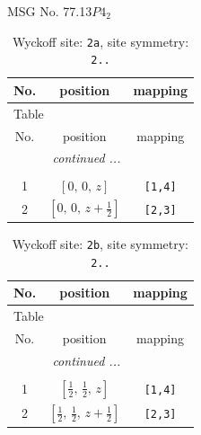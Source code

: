 \documentclass[fleqn,8pt]{jsarticle}
\begin{document}
\setcounter{MaxMatrixCols}{32}

\renewcommand{\tablename}{Table~}
\renewcommand{\figurename}{Figure~}
\begin{center}
\LARGE
MSG No. 77.13\quad$P4_{2}$
\end{center}
\renewcommand{\arraystretch}{1.2}
\begin{longtable}{ccc}
\caption{Wyckoff site: {\tt 2a}, site symmetry: {\tt 2..}}
 \\
 \hline \hline
No. & position & mapping \\ \hline \endfirsthead

\multicolumn{2}{l}{\tablename\ \thetable{}} \\
 \hline \hline
No. & position & mapping \\ \hline \endhead

 \hline \hline
\multicolumn{2}{r}{\footnotesize\it continued ...} \\ \endfoot

 \hline \hline
\multicolumn{2}{r}{} \\ \endlastfoot

1 & $\left[ 0,\, 0,\, z \right]$ & {\tt [1,4]} \\ \hline
2 & $\left[ 0,\, 0,\, z + \frac{1}{2} \right]$ & {\tt [2,3]} \\
\end{longtable}
\renewcommand{\arraystretch}{1.2}
\begin{longtable}{ccc}
\caption{Wyckoff site: {\tt 2b}, site symmetry: {\tt 2..}}
 \\
 \hline \hline
No. & position & mapping \\ \hline \endfirsthead

\multicolumn{2}{l}{\tablename\ \thetable{}} \\
 \hline \hline
No. & position & mapping \\ \hline \endhead

 \hline \hline
\multicolumn{2}{r}{\footnotesize\it continued ...} \\ \endfoot

 \hline \hline
\multicolumn{2}{r}{} \\ \endlastfoot

1 & $\left[ \frac{1}{2},\, \frac{1}{2},\, z \right]$ & {\tt [1,4]} \\ \hline
2 & $\left[ \frac{1}{2},\, \frac{1}{2},\, z + \frac{1}{2} \right]$ & {\tt [2,3]} \\
\end{longtable}
\renewcommand{\arraystretch}{1.2}
\end{document}
